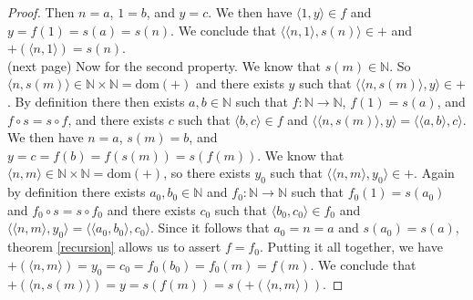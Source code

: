 \documentclass{report}
\begin{document}
\begin{proof}
Then $n=a$, $1=b$, and $y=c$. We then have $\langle 1,y\rangle\in f$ and $y=f(1)=s(a)=s(n)$.
We conclude that $\langle\langle n,1\rangle,s(n)\rangle\in+$ and $+(\langle n,1\rangle)=s(n)$.\\
(next page)\newpage
Now for the second property. We know that $s(m)\in\mathbb N$. So $\langle n,s(m)\rangle\in\mathbb N\times\mathbb N=\text{dom}(+)$ and there exists $y$ such that 
$\langle\langle n,s(m)\rangle,y\rangle\in+$. By definition there then exists $a,b\in\mathbb N$ such that $f:\mathbb N\to\mathbb N$, $f(1)=s(a)$, and $f\circ s=s\circ f$, and there 
exists $c$ such that $\langle b,c\rangle\in f$ and $\langle\langle n,s(m)\rangle,y\rangle=\langle\langle a,b\rangle,c\rangle$. 
We then have $n=a$, $s(m)=b$, and $y=c=f(b)=f(s(m))=s(f(m))$. We know that $\langle n,m\rangle\in\mathbb N\times\mathbb N=\text{dom}(+)$, so there exists $y_0$ such that 
$\langle\langle n,m\rangle,y_0\rangle\in+$. Again by definition there exists $a_0,b_0\in\mathbb N$ and $f_0:\mathbb N\to\mathbb N$ such that $f_0(1)=s(a_0)$ and $f_0\circ s=s\circ f_0$ and there 
exists $c_0$ such that $\langle b_0,c_0\rangle\in f_0$
and $\langle\langle n,m\rangle,y_0\rangle=\langle\langle a_0,b_0\rangle,c_0\rangle$. Since it follows that $a_0=n=a$ and $s(a_0)=s(a)$, theorem \ref{recursion} allows us to assert $f=f_0$.
Putting it all together, we have $+(\langle n,m\rangle)=y_0=c_0=f_0(b_0)=f_0(m)=f(m)$.
We conclude that $+(\langle n,s(m)\rangle)=y=s(f(m))=s(+(\langle n,m\rangle))$.
\end{proof}
\end{document}
